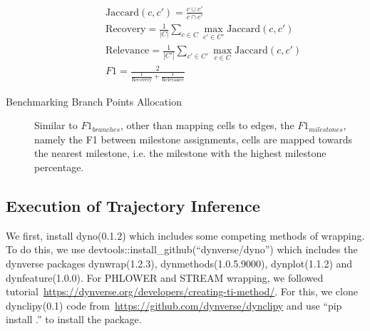 \begin{description}
	\begin{equation}
	\label{eqn:corrdist}
	\begin{aligned}
	& \text{Jaccard}(c, c')  = \frac{c\cup c'}{c\cap c'} \\
	& \text{Recovery} = \frac{1}{|C|}\sum_{c\in C} \max_{c'\in C'} \text{Jaccard}(c, c') \\
	& \text{Relevance} = \frac{1}{|C'|}\sum_{c' \in C'} \max_{c\in C} \text{Jaccard}(c, c')\\
	& F1 = \frac{2}{\frac{1}{\text{Recovery}} + \frac{1}{\text{Relevance}}}
	\end{aligned}
	\end{equation}

	\item[Benchmarking Branch Points Allocation]
	Similar to $F1_{branches}$, other than mapping cells to edges, the $F1_{milestones}$, namely the F1 between milestone assignments, cells are mapped towards the nearest milestone, i.e. the milestone with the highest milestone percentage.
\end{description}


\subsection{Execution of Trajectory Inference}
\label{PHLOWER_bench:exe}
We first, install dyno(0.1.2) which includes some competing methods of wrapping. To do this, we use devtools::install\_github(``dynverse/dyno'') which includes the dynverse packages dynwrap(1.2.3),  dynmethods(1.0.5.9000), dynplot(1.1.2) and dynfeature(1.0.0). For PHLOWER and STREAM wrapping, we followed tutorial~\url{https://dynverse.org/developers/creating-ti-method/}. For this, we clone dynclipy(0.1) code from~\url{https://github.com/dynverse/dynclipy} and use ``pip install .'' to install the package.

